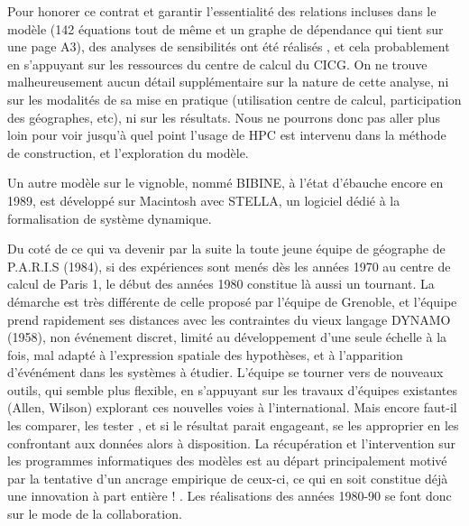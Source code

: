 Pour honorer ce contrat et garantir l'essentialité des relations incluses dans le modèle (142 équations tout de même et un graphe de dépendance qui tient sur une page A3), des analyses de sensibilités ont été réalisés \autocite[34]{AMORAL1983}, et cela probablement en s'appuyant sur les ressources du centre de calcul du CICG. On ne trouve malheureusement aucun détail supplémentaire sur la nature de cette analyse, ni sur les modalités de sa mise en pratique (utilisation centre de calcul, participation des géographes, etc), ni sur les résultats. Nous ne pourrons donc pas aller plus loin pour voir jusqu'à quel point l'usage de HPC est intervenu dans la méthode de construction, et l'exploration du modèle.

Un autre modèle sur le vignoble, nommé BIBINE, à l'état d'ébauche encore en 1989, est développé sur Macintosh avec STELLA, un logiciel dédié à la formalisation de système dynamique. \autocite{Chamussy1989}

Du coté de ce qui va devenir par la suite la toute jeune équipe de géographe de P.A.R.I.S (1984), si des expériences sont menés dès les années 1970 au centre de calcul de Paris 1, le début des années 1980 constitue là aussi un tournant. La démarche est très différente de celle proposé par l'équipe de Grenoble, et l'équipe prend rapidement ses distances avec les contraintes du vieux langage DYNAMO (1958), non événement discret, limité au développement d'une seule échelle à la fois, mal adapté à l'expression spatiale des hypothèses, et à l'apparition d'événément dans les systèmes à étudier. L'équipe se tourner vers de nouveaux outils, qui semble plus flexible, en s'appuyant sur les travaux d'équipes existantes (Allen, Wilson) explorant ces nouvelles voies à l'international. Mais encore faut-il les comparer, les tester \autocite{Pumain1983}, et si le résultat parait engageant, se les approprier en les confrontant aux données alors à disposition. La récupération et l'intervention sur les programmes informatiques des modèles est au départ principalement motivé par la tentative d’un ancrage empirique de ceux-ci, ce qui en soit constitue déjà une innovation à part entière ! \autocite{Pumain1982}.
Les réalisations des années 1980-90 se font donc sur le mode de la collaboration.

